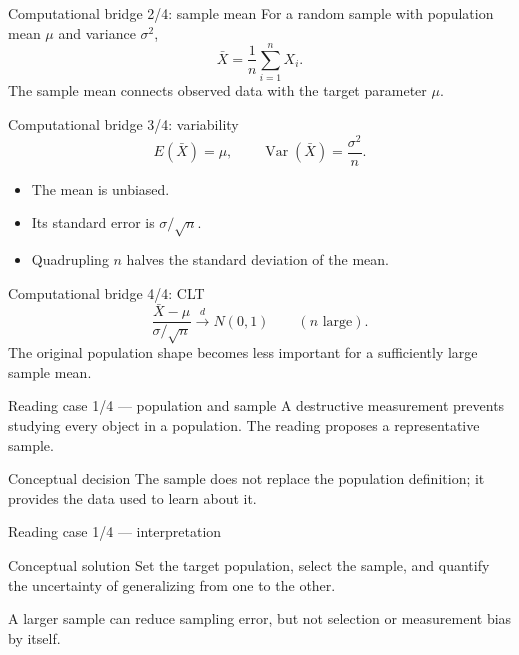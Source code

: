\documentclass[10pt,aspectratio=169]{beamer}
\begin{document}
\begin{frame}{Computational bridge 2/4: sample mean}
  \footnotesize
  For a random sample with population mean $\mu$ and variance $\sigma^2$,
  \[
    \bar X=\frac{1}{n}\sum_{i=1}^{n}X_i.
  \]
  The sample mean connects observed data with the target parameter $\mu$.
\end{frame}

\begin{frame}{Computational bridge 3/4: variability}
  \footnotesize
  \[
    E(\bar X)=\mu,\qquad \operatorname{Var}(\bar X)=\frac{\sigma^2}{n}.
  \]
  \begin{itemize}\itemsep=0.13cm
    \item The mean is unbiased.
    \item Its standard error is $\sigma/\sqrt n$.
    \item Quadrupling $n$ halves the standard deviation of the mean.
  \end{itemize}
\end{frame}

\begin{frame}{Computational bridge 4/4: CLT}
  \footnotesize
  \[
    \frac{\bar X-\mu}{\sigma/\sqrt n}\xrightarrow{d}N(0,1)
    \qquad(n\text{ large}).
  \]
  The original population shape becomes less important for a sufficiently large
  sample mean.
\end{frame}

\begin{frame}{Reading case 1/4 --- population and sample}
  \footnotesize
  A destructive measurement prevents studying every object in a population.
  The reading proposes a representative sample.
  \begin{alertblock}{Conceptual decision}
    The sample does not replace the population definition; it provides the data
    used to learn about it.
  \end{alertblock}
\end{frame}

\begin{frame}{Reading case 1/4 --- interpretation}
  \footnotesize
  \begin{block}{Conceptual solution}
    Set the target population, select the sample, and quantify the uncertainty
    of generalizing from one to the other.
  \end{block}
  A larger sample can reduce sampling error, but not selection or measurement
  bias by itself.
\end{frame}
\end{document}
